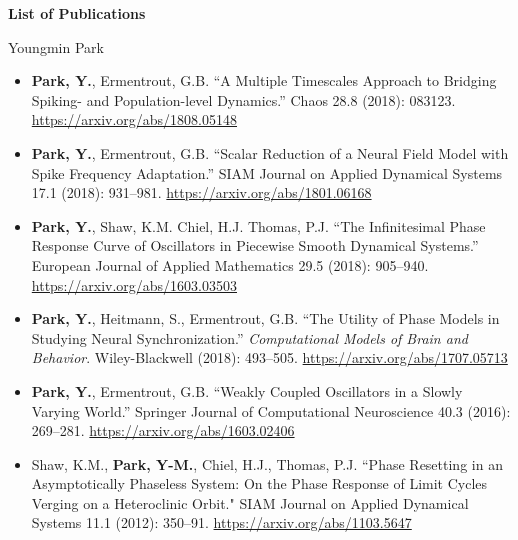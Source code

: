 \documentclass[a4paper,11pt]{article}
\begin{document}
\begin{center}
\Large \textbf{List of Publications}

\Large Youngmin Park
\end{center}

\begin{itemize}
 \item \textbf{Park, Y.}, Ermentrout, G.B. ``A Multiple Timescales Approach to Bridging Spiking- and Population-level Dynamics.'' Chaos 28.8 (2018): 083123. \url{https://arxiv.org/abs/1808.05148}
 \item \textbf{Park, Y.}, Ermentrout, G.B. ``Scalar Reduction of a Neural Field Model with Spike Frequency Adaptation.'' SIAM Journal on Applied Dynamical Systems 17.1 (2018): 931--981. \url{https://arxiv.org/abs/1801.06168}
 \item \textbf{Park, Y.}, Shaw, K.M. Chiel, H.J. Thomas, P.J. ``The Infinitesimal Phase Response Curve of Oscillators in Piecewise Smooth Dynamical Systems.'' European Journal of Applied Mathematics 29.5 (2018): 905--940. \url{https://arxiv.org/abs/1603.03503}
 \item \textbf{Park, Y.}, Heitmann, S., Ermentrout, G.B. ``The Utility of Phase Models in Studying Neural Synchronization.'' \textit{Computational Models of Brain and Behavior}. Wiley-Blackwell (2018): 493--505. \url{https://arxiv.org/abs/1707.05713}
 \item \textbf{Park, Y.}, Ermentrout, G.B. ``Weakly Coupled Oscillators in a Slowly Varying World.'' Springer Journal of Computational Neuroscience 40.3 (2016): 269--281. \url{https://arxiv.org/abs/1603.02406}
 \item Shaw, K.M., \textbf{Park, Y-M.}, Chiel, H.J., Thomas, P.J. ``Phase Resetting in an Asymptotically Phaseless System: On the Phase Response of Limit Cycles Verging on a Heteroclinic Orbit." SIAM Journal on Applied Dynamical Systems 11.1 (2012): 350--91. \url{https://arxiv.org/abs/1103.5647}
\end{itemize}
\end{document}
